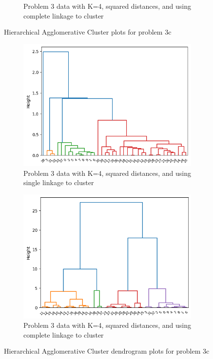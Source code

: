 \documentclass[12pt]{article}
\begin{document}
\begin{figure}[ht!]
\begin{subfigure}{0.5\textwidth}
        \caption{Problem 3 data with K=4, squared distances, and using complete linkage to cluster}
        \label{fig:complete_squared}
    \end{subfigure}
    \caption{Hierarchical Agglomerative Cluster plots for problem 3c}\label{fig:3c}
\end{figure}

\begin{figure}[ht!]
    \begin{subfigure}{0.5\textwidth}
        \centering
        \includegraphics[width=\linewidth]{../plots/3c_single_squared_dendrogram.png}
        \caption{Problem 3 data with K=4, squared distances, and using single linkage to cluster}
    \end{subfigure}
    \begin{subfigure}{0.5\textwidth}
        \centering
        \includegraphics[width=\linewidth]{../plots/3c_complete_squared_dendrogram.png}
        \caption{Problem 3 data with K=4, squared distances, and using complete linkage to cluster}
    \end{subfigure}
    \caption{Hierarchical Agglomerative Cluster dendrogram plots for problem 3c}\label{fig:3c_den}
\end{figure}
\end{document}
